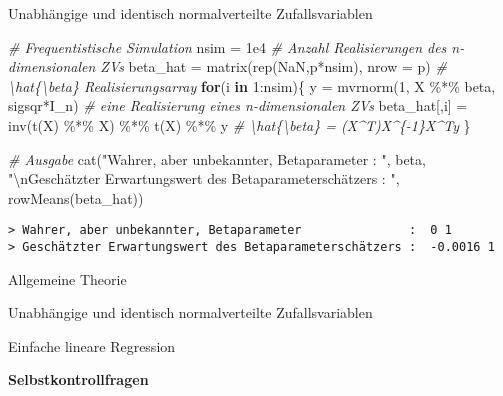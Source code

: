 \documentclass[
  8pt,
  ignorenonframetext,
]{beamer}
\newenvironment{Shaded}{\begin{snugshade}}{\end{snugshade}}
\newcommand{\AttributeTok}[1]{\textcolor[rgb]{0.77,0.63,0.00}{#1}}
\newcommand{\CommentTok}[1]{\textcolor[rgb]{0.56,0.35,0.01}{\textit{#1}}}
\newcommand{\ConstantTok}[1]{\textcolor[rgb]{0.00,0.00,0.00}{#1}}
\newcommand{\ControlFlowTok}[1]{\textcolor[rgb]{0.13,0.29,0.53}{\textbf{#1}}}
\newcommand{\DecValTok}[1]{\textcolor[rgb]{0.00,0.00,0.81}{#1}}
\newcommand{\FloatTok}[1]{\textcolor[rgb]{0.00,0.00,0.81}{#1}}
\newcommand{\FunctionTok}[1]{\textcolor[rgb]{0.00,0.00,0.00}{#1}}
\newcommand{\NormalTok}[1]{#1}
\newcommand{\OtherTok}[1]{\textcolor[rgb]{0.56,0.35,0.01}{#1}}
\newcommand{\SpecialCharTok}[1]{\textcolor[rgb]{0.00,0.00,0.00}{#1}}
\newcommand{\StringTok}[1]{\textcolor[rgb]{0.31,0.60,0.02}{#1}}
\begin{document}
\begin{frame}[fragile]{Unabhängige und identisch normalverteilte
Zufallsvariablen}
\begin{Shaded}
\begin{Highlighting}[]
\CommentTok{\# Frequentistische Simulation}
\NormalTok{nsim     }\OtherTok{=} \FloatTok{1e4}                                      \CommentTok{\# Anzahl Realisierungen des n{-}dimensionalen ZVs}
\NormalTok{beta\_hat }\OtherTok{=} \FunctionTok{matrix}\NormalTok{(}\FunctionTok{rep}\NormalTok{(}\ConstantTok{NaN}\NormalTok{,p}\SpecialCharTok{*}\NormalTok{nsim), }\AttributeTok{nrow =}\NormalTok{ p)        }\CommentTok{\# \textbackslash{}hat\{\textbackslash{}beta\} Realisierungsarray}
\ControlFlowTok{for}\NormalTok{(i }\ControlFlowTok{in} \DecValTok{1}\SpecialCharTok{:}\NormalTok{nsim)\{}
\NormalTok{  y            }\OtherTok{=} \FunctionTok{mvrnorm}\NormalTok{(}\DecValTok{1}\NormalTok{, X }\SpecialCharTok{\%*\%}\NormalTok{ beta, sigsqr}\SpecialCharTok{*}\NormalTok{I\_n) }\CommentTok{\# eine Realisierung eines n{-}dimensionalen ZVs}
\NormalTok{  beta\_hat[,i] }\OtherTok{=} \FunctionTok{inv}\NormalTok{(}\FunctionTok{t}\NormalTok{(X) }\SpecialCharTok{\%*\%}\NormalTok{ X) }\SpecialCharTok{\%*\%} \FunctionTok{t}\NormalTok{(X) }\SpecialCharTok{\%*\%}\NormalTok{ y     }\CommentTok{\# \textbackslash{}hat\{\textbackslash{}beta\} = (X\^{}T)X\^{}\{{-}1\}X\^{}Ty }
\NormalTok{\}}

\CommentTok{\# Ausgabe}
\FunctionTok{cat}\NormalTok{(}\StringTok{"Wahrer, aber unbekannter, Betaparameter               : "}\NormalTok{, beta,}
    \StringTok{"}\SpecialCharTok{\textbackslash{}n}\StringTok{Geschätzter Erwartungswert des Betaparameterschätzers : "}\NormalTok{, }\FunctionTok{rowMeans}\NormalTok{(beta\_hat))}
\end{Highlighting}
\end{Shaded}

\begin{verbatim}
> Wahrer, aber unbekannter, Betaparameter               :  0 1 
> Geschätzter Erwartungswert des Betaparameterschätzers :  -0.0016 1
\end{verbatim}
\end{frame}

\begin{frame}{}
\protect\hypertarget{section-6}{}
\large
{}
\vfill

Allgemeine Theorie

Unabhängige und identisch normalverteilte Zufallsvariablen

Einfache lineare Regression

\textbf{Selbstkontrollfragen}

\vfill
\end{frame}
\end{document}
